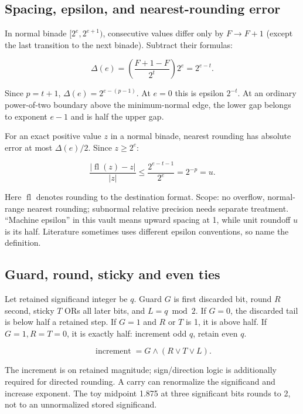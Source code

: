 \subsection{Spacing, epsilon, and nearest-rounding error}\label{01-foundations-i-ch011-spacing-epsilon-and-nearest-rounding-error}

In normal binade \([2^e,2^{e+1})\), consecutive values differ only by \(F\to F+1\) (except the last transition to the next binade). Subtract their formulas:

\[
\Delta(e)=\left(\frac{F+1-F}{2^t}\right)2^e=2^{e-t}.
\]

Since \(p=t+1\), \(\Delta(e)=2^{e-(p-1)}\). At \(e=0\) this is epsilon \(2^{-t}\). At an ordinary power-of-two boundary above the minimum-normal edge, the lower gap belongs to exponent \(e-1\) and is half the upper gap.

For an exact positive value \(z\) in a normal binade, nearest rounding has absolute error at most \(\Delta(e)/2\). Since \(z\ge2^e\):

\[
\frac{|\operatorname{fl}(z)-z|}{|z|}
\le\frac{2^{e-t-1}}{2^e}=2^{-p}=u.
\]

Here \(\operatorname{fl}\) denotes rounding to the destination format. Scope: no overflow, normal-range nearest rounding; subnormal relative precision needs separate treatment. ``Machine epsilon'' in this vault means upward spacing at 1, while unit roundoff \(u\) is its half. Literature sometimes uses different epsilon conventions, so name the definition.

\subsection{Guard, round, sticky and even ties}\label{01-foundations-i-ch011-guard-round-sticky-and-even-ties}

Let retained significand integer be \(q\). Guard \(G\) is first discarded bit, round \(R\) second, sticky \(T\) ORs all later bits, and \(L=q\bmod2\). If \(G=0\), the discarded tail is below half a retained step. If \(G=1\) and \(R\) or \(T\) is 1, it is above half. If \(G=1,R=T=0\), it is exactly half: increment odd \(q\), retain even \(q\).

\[
\operatorname{increment}=G\land(R\lor T\lor L).
\]

The increment is on retained magnitude; sign/direction logic is additionally required for directed rounding. A carry can renormalize the significand and increase exponent. The toy midpoint 1.875 at three significant bits rounds to 2, not to an unnormalized stored significand.

